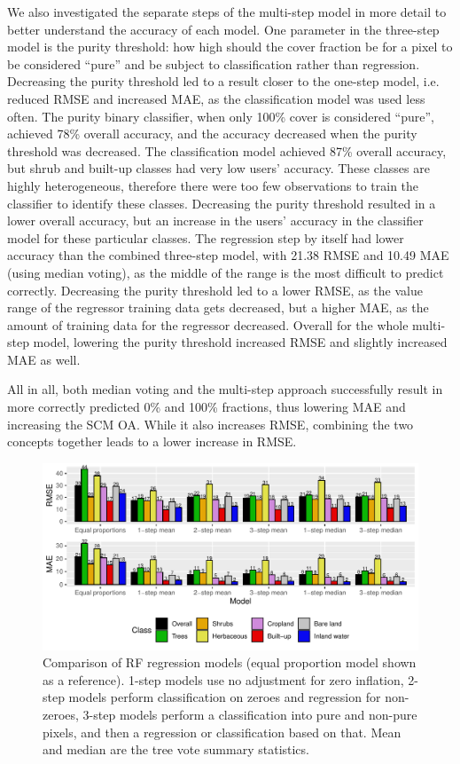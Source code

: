 \documentclass[review,authoryear,3p]{elsarticle}
\begin{document}
We also investigated the separate steps of the multi-step model in more detail to better understand the accuracy of each model.
One parameter in the three-step model is the purity threshold: how high should the cover fraction be for a pixel to be considered ``pure'' and be subject to classification rather than regression.
Decreasing the purity threshold led to a result closer to the one-step model, i.e. reduced \gls{RMSE} and increased \gls{MAE}, as the classification model was used less often.
The purity binary classifier, when only 100\% cover is considered ``pure'', achieved 78\% overall accuracy, and the accuracy decreased when the purity threshold was decreased.
The classification model achieved 87\% overall accuracy, but shrub and built-up classes had very low users' accuracy.
These classes are highly heterogeneous, therefore there were too few observations to train the classifier to identify these classes.
Decreasing the purity threshold resulted in a lower overall accuracy, but an increase in the users' accuracy in the classifier model for these particular classes.
The regression step by itself had lower accuracy than the combined three-step model, with 21.38 \gls{RMSE} and 10.49 \gls{MAE} (using median voting), as the middle of the range is the most difficult to predict correctly.
Decreasing the purity threshold led to a lower \gls{RMSE}, as the value range of the regressor training data gets decreased, but a higher \gls{MAE}, as the amount of training data for the regressor decreased.
Overall for the whole multi-step model, lowering the purity threshold increased \gls{RMSE} and slightly increased \gls{MAE} as well.

All in all, both median voting and the multi-step approach successfully result in more correctly predicted 0\% and 100\% fractions, thus lowering \gls{MAE} and increasing the \gls{SCM} \gls{OA}.
While it also increases \gls{RMSE}, combining the two concepts together leads to a lower increase in \gls{RMSE}.

\begin{figure}
    \centering
    \includegraphics[width=\textwidth]{article-figures/barplots/2020-06-04-rf-comparison-bar}
    \caption{Comparison of \gls{RF} regression models (equal proportion model shown as a reference). 1-step models use no adjustment for zero inflation, 2-step models perform classification on zeroes and regression for non-zeroes, 3-step models perform a classification into pure and non-pure pixels, and then a regression or classification based on that. Mean and median are the tree vote summary statistics.}
    \label{fig-randomforest}
\end{figure}
\end{document}
